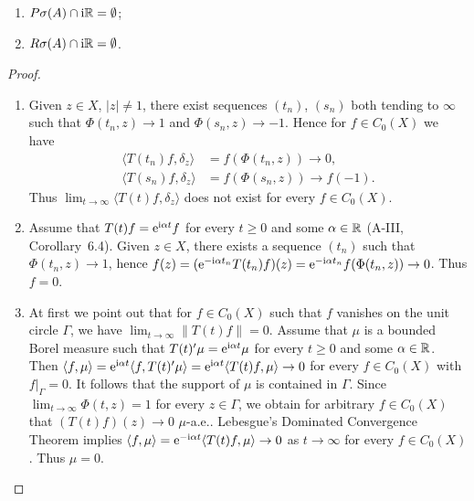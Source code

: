 \begin{example}
\begin{enumerate}[\upshape (i), wide, labelindent=.5em]
\begin{enumerate}[\upshape (i)]
	\item 
	$P\sigma(A)\cap\mathrm{i}\mathbb{R} = \emptyset$;
	
	\item 
	$R\sigma(A)\cap\mathrm{i}\mathbb{R} = \emptyset$.
\end{enumerate}
\begin{proof}
\begin{enumerate}[\upshape (i), wide, labelindent=.5em]

\item
Given $z \in X$, $|z| \neq 1$, there exist sequences $(t_n)$, $(s_n)$ both tending to $\infty$ such that $\Phi(t_n,z) \to 1$ and $\Phi(s_n,z) \to -1$. 
Hence for $f \in C_{0}(X)$ we have
\[
   \begin{aligned}
   \langle T(t_n)f,\delta_z \rangle &= f(\Phi(t_n,z)) \to 0 ,\\
   \langle T(s_n)f,\delta_z \rangle &= f(\Phi(s_n,z)) \to f(-1) .
   \end{aligned}
\]
Thus $\lim_{t\to\infty} \langle T(t)f,\delta_z \rangle$ does not exist for every $f \in C_{0}(X)$.


\item
Assume that $T(t)f = \mathrm{e}^{\mathrm{i}\alpha t}f$ for every $t \geq 0$ and some $\alpha \in \mathbb{R}$ (\cf A-III, Corollary~6.4). 
Given $z \in X$, there exists a sequence $(t_n)$ such that $\Phi(t_n,z) \to 1$, hence
$f(z) = (\mathrm{e}^{-\mathrm{i}\alpha t_n}T(t_n)f)(z) = \mathrm{e}^{-\mathrm{i}\alpha t_n}f(\Phi(t_n,z)) \to 0$. Thus $f = 0$.


\item
At first we point out that for $f \in C_{0}(X)$ such that $f$ vanishes on the unit circle $\Gamma$, we have $\lim_{t\to\infty} \|T(t)f\| = 0$.
Assume that $\mu$ is a bounded Borel measure such that $T(t)'\mu = \mathrm{e}^{\mathrm{i}\alpha t}\mu$ for every $t \geq 0$ and some $\alpha \in \mathbb{R}$. 
Then $\langle f,\mu \rangle = \mathrm{e}^{\mathrm{i}\alpha t}\langle f,T(t)'\mu \rangle = \mathrm{e}^{\mathrm{i}\alpha t}\langle T(t)f,\mu \rangle \to 0$ for every $f \in C_{0}(X)$ with $f|_\Gamma = 0$. 
It follows that the support of $\mu$ is contained in $\Gamma$. Since $\lim_{t\to\infty} \Phi(t,z) = 1$ for every $z \in \Gamma$, we obtain for arbitrary $f \in C_{0}(X)$ that $(T(t)f)(z) \to 0$ $\mu$-a.e.. 
Lebesgue's Dominated Convergence Theorem implies $\langle f,\mu \rangle = \mathrm{e}^{-\mathrm{i}\alpha t}\langle T(t)f,\mu \rangle \to 0$ as $t \to \infty$ for every $f \in C_{0}(X)$. Thus $\mu = 0$.
\end{enumerate}
\end{proof}
\end{enumerate}
\end{example}

